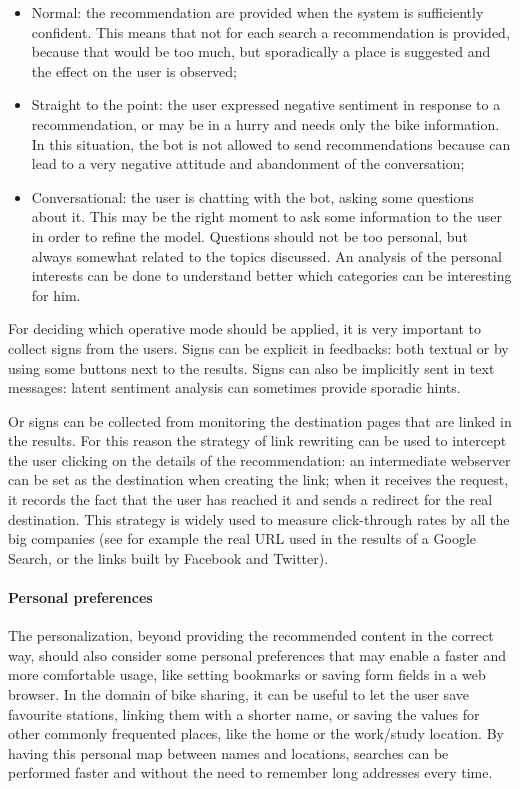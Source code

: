 \begin{itemize}
	\item Normal: the recommendation are provided when the system is sufficiently confident. This means that not for each search a recommendation is provided, because that would be too much, but sporadically a place is suggested and the effect on the user is observed;

	\item Straight to the point: the user expressed negative sentiment in response to a recommendation, or may be in a hurry and needs only the bike information. In this situation, the bot is not allowed to send recommendations because can lead to a very negative attitude and abandonment of the conversation;

	\item Conversational: the user is chatting with the bot, asking some questions about it. This may be the right moment to ask some information to the user in order to refine the model. Questions should not be too personal, but always somewhat related to the topics discussed. An analysis of the personal interests can be done to understand better which categories can be interesting for him.
\end{itemize}

For deciding which operative mode should be applied, it is very important to collect signs from the users. Signs can be explicit in feedbacks: both textual or by using some buttons next to the results. Signs can also be implicitly sent in text messages: latent sentiment analysis can sometimes provide sporadic hints.

Or signs can be collected from monitoring the destination pages that are linked in the results. For this reason the strategy of link rewriting can be used to intercept the user clicking on the details of the recommendation: an intermediate webserver can be set as the destination when creating the link; when it receives the request, it records the fact that the user has reached it and sends a redirect for the real destination. This strategy is widely used to measure click-through rates by all the big companies (see for example the real URL used in the results of a Google Search, or the links built by Facebook and Twitter).

\paragraph{Personal preferences}
The personalization, beyond providing the recommended content in the correct way, should also consider some personal preferences that may enable a faster and more comfortable usage, like setting bookmarks or saving form fields in a web browser. In the domain of bike sharing, it can be useful to let the user save favourite stations, linking them with a shorter name, or saving the values for other commonly frequented places, like the home or the work/study location. By having this personal map between names and locations, searches can be performed faster and without the need to remember long addresses every time.

